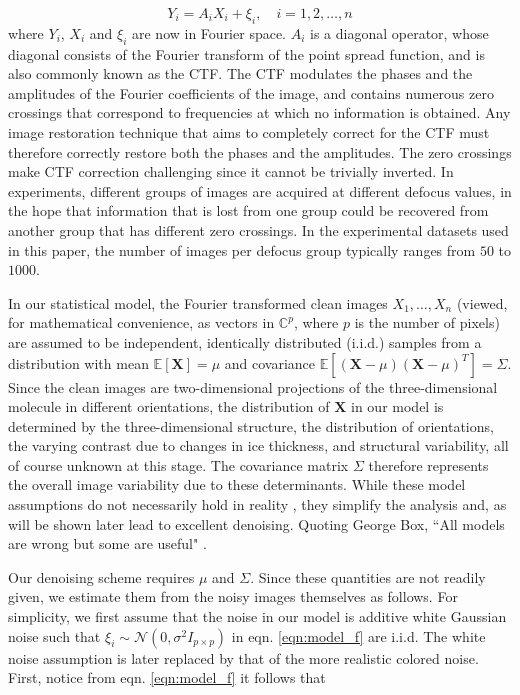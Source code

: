 \documentclass[review]{elsarticle}
\begin{document}
\begin{equation}
 Y_i = A_i X_i + \xi_i, \quad i=1,2,\ldots,n
\label{eqn:model_f}
\end{equation}
where $Y_i$, $X_i$ and $\xi_i$ are now in Fourier space. $A_i$ is 
a diagonal operator, whose diagonal consists of
the Fourier transform of the point spread function,
and is also commonly known as the CTF. The CTF modulates the
phases and the amplitudes of the Fourier coefficients of the image, and contains
numerous zero crossings that correspond
to frequencies at which no information is obtained.
Any image restoration technique that aims to completely correct for the CTF
must therefore correctly restore both the phases and the amplitudes.
The zero crossings make CTF correction
challenging since it cannot be trivially inverted. 
In experiments, different
groups of images are acquired at different defocus values, in the hope that 
information that is lost from one group could be
recovered from another group that has different zero crossings. In the experimental
datasets used in this paper, the number of images per defocus group typically ranges from 
$50$ to $1000$.

In our statistical model, the Fourier transformed clean images $X_1,\dots,X_n$ 
(viewed, for mathematical convenience, as vectors in $\mathbb{C}^p$, where $p$ is the number of pixels) 
are assumed to be independent,
identically distributed (i.i.d.) samples from a distribution with mean $\mathbb{E}[\textbf{X}]=\mu$
and covariance $\mathbb{E}[(\textbf{X}-\mu)(\textbf{X}-\mu)^T]=\Sigma$. 
Since the clean images are two-dimensional projections of the three-dimensional molecule in different orientations, 
the distribution of $\textbf{X}$ in our model is determined by the three-dimensional structure, the distribution of orientations, 
the varying contrast due to changes in ice thickness, and structural variability, all of course unknown at this stage. 
The covariance matrix $\Sigma$ therefore represents the overall image variability due to these determinants.
While these model assumptions do not necessarily hold in reality \cite{sorzano1, sorzano2}, they simplify the analysis and, as will be shown later lead to excellent denoising.
Quoting George Box, ``All models are wrong but some are useful" \cite{box}.

Our denoising scheme requires $\mu$ and
$\Sigma$. Since these quantities are not readily given, we estimate them from the noisy images themselves as follows.
For simplicity, we first assume that the noise in our model is additive 
white
Gaussian noise such that $\xi_i \sim \mathcal{N} (0,\sigma^2 I_{p \times p})$ 
in eqn. \ref{eqn:model_f} are i.i.d. The white noise assumption is later replaced by that 
of the more realistic colored noise. First, notice from eqn. \ref{eqn:model_f} it follows that
\end{document}
